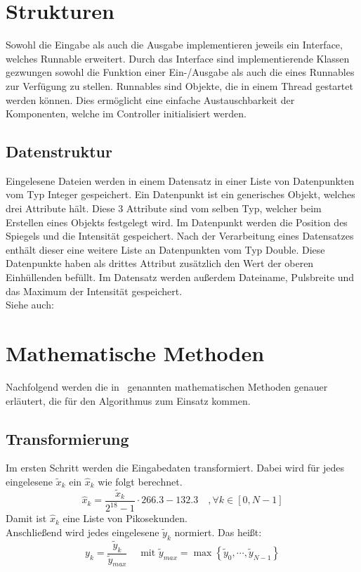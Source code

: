 \section{Strukturen}\label{subsec:strukturen}
Sowohl die Eingabe als auch die Ausgabe implementieren jeweils ein Interface, welches Runnable erweitert.
Durch das Interface sind implementierende Klassen gezwungen sowohl die Funktion einer Ein-/Ausgabe als auch die eines Runnables zur Verfügung zu stellen.
Runnables sind Objekte, die in einem Thread gestartet werden können.
Dies ermöglicht eine einfache Austauschbarkeit der Komponenten, welche im Controller initialisiert werden.

\subsection{Datenstruktur}\label{subsec:datenstruktur}
Eingelesene Dateien werden in einem Datensatz in einer Liste von Datenpunkten vom Typ Integer gespeichert.
Ein Datenpunkt ist ein generisches Objekt, welches drei Attribute hält.
Diese 3 Attribute sind vom selben Typ, welcher beim Erstellen eines Objekts festgelegt wird.
Im Datenpunkt werden die Position des Spiegels und die Intensität gespeichert.
Nach der Verarbeitung eines Datensatzes enthält dieser eine weitere Liste an Datenpunkten vom Typ Double.
Diese Datenpunkte haben als drittes Attribut zusätzlich den Wert der oberen Einhüllenden befüllt.
Im Datensatz werden außerdem Dateiname, Pulsbreite und das Maximum der Intensität gespeichert.\\
Siehe auch:
\protect\newpage


\section{Mathematische Methoden}\label{sec:mathematische-methoden}
Nachfolgend werden die in~ genannten mathematischen Methoden genauer erläutert, die für den Algorithmus zum Einsatz kommen.

\subsection{Transformierung}\label{subsec:transformierung}
Im ersten Schritt werden die Eingabedaten transformiert.
Dabei wird für jedes eingelesene $\tilde{x}_k \text{ ein } \hat{x}_k$ wie folgt berechnet.
\begin{equation}
    \hat{x}_{k}=\frac{\tilde{x}_{k}}{2^{18}-1} \cdot 266.3-132.3 \quad, \forall k \in[0, N-1]\label{eq:transformation}
\end{equation}
Damit ist $\hat{x}_k$ eine Liste von Pikosekunden.\\
Anschließend wird jedes eingelesene $\tilde{y}_k$ normiert.
Das heißt:
\begin{equation}
    y_k=\frac{\tilde{y}_k}{\tilde{y}_{max}} \quad \text{ mit } \tilde{y}_{max}=\max{\left\{ \tilde{y}_0, \cdots,\tilde{y}_{N-1}\right\}}\label{eq:y_norm}
\end{equation}

